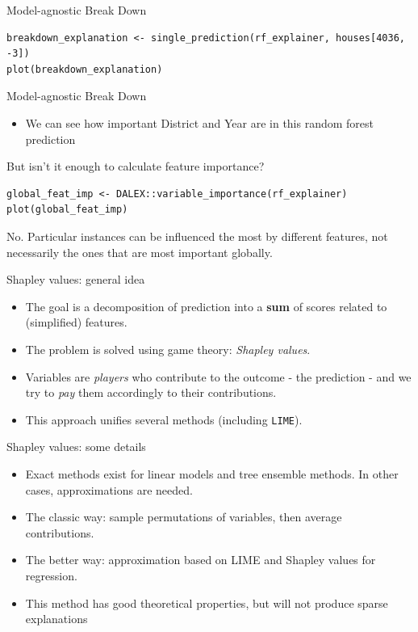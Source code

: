 \documentclass[xcolor={dvipsnames}]{beamer}
\begin{document}
\begin{frame}[fragile]{Model-agnostic Break Down}
	\begin{lstlisting}
breakdown_explanation <- single_prediction(rf_explainer, houses[4036, -3])
plot(breakdown_explanation)
	\end{lstlisting}
\end{frame}


\begin{frame}{Model-agnostic Break Down}
	\begin{itemize}
		\item We can see how important District and Year are in this random forest prediction
	\end{itemize}
\end{frame}

\begin{frame}[fragile]{But isn't it enough to calculate feature importance?}
	\begin{lstlisting}
global_feat_imp <- DALEX::variable_importance(rf_explainer)
plot(global_feat_imp)
	\end{lstlisting}
	
	No. Particular instances can be influenced the most by different features,
	not necessarily the ones that are most important globally.
\end{frame}

\begin{frame}{Shapley values: general idea}
  \begin{itemize}
	\item The goal is a decomposition of prediction into a \textbf{sum} of scores related to (simplified) features.
	\item The problem is solved using game theory: \textit{Shapley values}. 
	\item Variables are \textit{players} who contribute to the outcome - the prediction - and we try to \textit{pay} them accordingly to their contributions.
	\item This approach unifies several methods (including \texttt{LIME}).
  \end{itemize}
\end{frame}

\begin{frame}{Shapley values: some details}
	\begin{itemize}
		\item Exact methods exist for linear models and tree ensemble methods.
		In other cases, approximations are needed.
		
		\item The classic way: sample permutations of variables, then average contributions.
		
		\item The better way: approximation based on LIME and Shapley values for regression.
		
		\item This method has good theoretical properties, but will not produce sparse explanations
	\end{itemize}
\end{frame}
\end{document}
